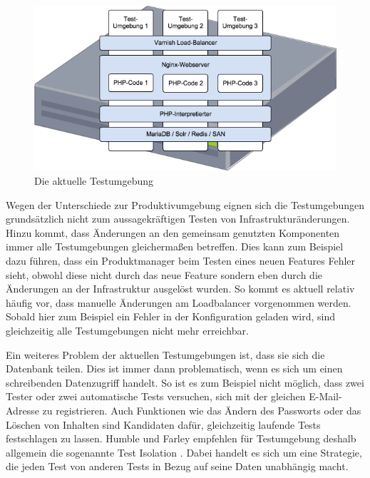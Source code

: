 \begin{figure}[!ht]
  \begin{center}
    \includegraphics[width=14cm]{bilder/Aktuelle-Testumgebung.png}
    \caption{Die aktuelle Testumgebung}
    \label{alte-test}
  \end{center}
\end{figure}

Wegen der Unterschiede zur Produktivumgebung eignen sich die Testumgebungen grundsätzlich nicht zum aussagekräftigen Testen von Infrastrukturänderungen. Hinzu kommt, dass Änderungen an den gemeinsam genutzten Komponenten immer alle Testumgebungen gleichermaßen betreffen. Dies kann zum Beispiel dazu führen, dass ein Produktmanager beim Testen eines neuen Features Fehler sieht, obwohl diese nicht durch das neue Feature sondern eben durch die Änderungen an der Infrastruktur ausgelöst wurden. So kommt es aktuell relativ häufig vor, dass manuelle Änderungen am Loadbalancer vorgenommen werden. Sobald hier zum Beispiel ein Fehler in der Konfiguration geladen wird, sind gleichzeitig alle Testumgebungen nicht mehr erreichbar.

Ein weiteres Problem der aktuellen Testumgebungen ist, dass sie sich die Datenbank teilen. Dies ist immer dann problematisch, wenn es sich um einen schreibenden Datenzugriff handelt. So ist es zum Beispiel nicht möglich, dass zwei Tester oder zwei automatische Tests versuchen, sich mit der gleichen E-Mail-Adresse zu registrieren. Auch Funktionen wie das Ändern des Passworts oder das Löschen von Inhalten sind Kandidaten dafür, gleichzeitig laufende Tests festschlagen zu lassen. Humble und Farley empfehlen für Testumgebung deshalb allgemein die sogenannte Test Isolation \citep[Vgl.][S. 337]{HumFar10}. Dabei handelt es sich um eine Strategie, die jeden Test von anderen Tests in Bezug auf seine Daten unabhängig macht.

